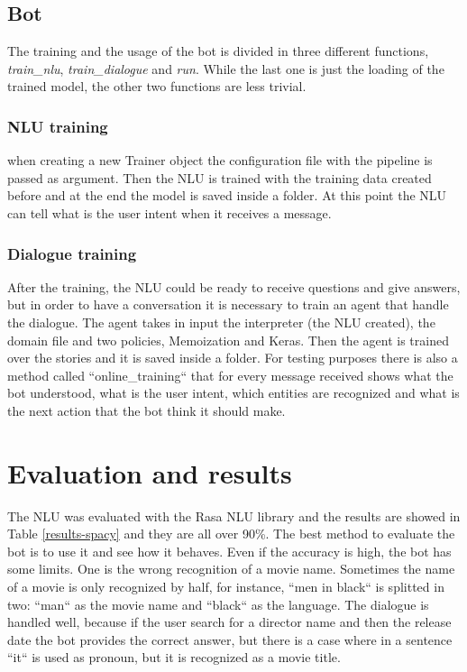 \documentclass[11pt,a4paper]{article}
\begin{document}
\subsection{Bot}
\qquad The training and the usage of the bot is divided in three different functions, \textit{train\_nlu}, \textit{train\_dialogue} and \textit{run}. While the last one is just the loading of the trained model, the other two functions are less trivial.
\subsubsection{NLU training}
\qquad when creating a new Trainer object the configuration file with the pipeline is passed as argument. Then the NLU is trained with the training data created before and at the end the model is saved inside a folder. At this point the NLU can tell what is the user intent when it receives a message.
\subsubsection{Dialogue training}
\qquad After the training, the NLU could be ready to receive questions and give answers, but in order to have a conversation it is necessary to train an agent that handle the dialogue. The agent takes in input the interpreter (the NLU created), the domain file and two policies, Memoization and Keras. Then the agent is trained over the stories and it is saved inside a folder. For testing purposes there is also a method called ``online\_training`` that for every message received shows what the bot understood, what is the user intent, which entities are recognized and what is the next action that the bot think it should make.

\section{Evaluation and results}
\qquad The NLU was evaluated with the Rasa NLU library and the results are showed in Table \ref{results-spacy} and they are all over 90\%. The best method to evaluate the bot is to use it and see how it behaves. Even if the accuracy is high, the bot has some limits. One is the wrong recognition of a movie name. Sometimes the name of a movie is only recognized by half, for instance, ``men in black`` is splitted in two: ``man`` as the movie name and ``black`` as the language. The dialogue is handled well, because if the user search for a director name and then the release date the bot provides the correct answer, but there is a case where in a sentence ``it`` is used as pronoun, but it is recognized as a movie title. 
\end{document}
